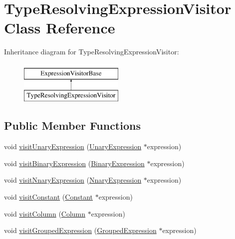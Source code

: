 \hypertarget{class_type_resolving_expression_visitor}{\section{Type\+Resolving\+Expression\+Visitor Class Reference}
\label{class_type_resolving_expression_visitor}
}
Inheritance diagram for Type\+Resolving\+Expression\+Visitor\+:\begin{figure}[H]
\begin{center}
\leavevmode
\includegraphics[height=2.000000cm]{class_type_resolving_expression_visitor}
\end{center}
\end{figure}
\subsection*{Public Member Functions}
\begin{DoxyCompactItemize}
\item 
void \hyperlink{class_type_resolving_expression_visitor_a9ae5e5542bbcdfbf81c7c6efb5b3e4fe}{visit\+Unary\+Expression} (\hyperlink{class_unary_expression}{Unary\+Expression} $\ast$expression)
\item 
void \hyperlink{class_type_resolving_expression_visitor_a6f4aca2ea71660065b44815b2a7e6bd8}{visit\+Binary\+Expression} (\hyperlink{class_binary_expression}{Binary\+Expression} $\ast$expression)
\item 
void \hyperlink{class_type_resolving_expression_visitor_a75c505a51dc15d3d4a7c2e5c539f04e7}{visit\+Nnary\+Expression} (\hyperlink{class_nnary_expression}{Nnary\+Expression} $\ast$expression)
\item 
void \hyperlink{class_type_resolving_expression_visitor_a7c5f29e6a4331aafc5bba63e3af64ecd}{visit\+Constant} (\hyperlink{class_constant}{Constant} $\ast$expression)
\item 
void \hyperlink{class_type_resolving_expression_visitor_a1ea3d7f6a0ebd1296df38d71420596bd}{visit\+Column} (\hyperlink{class_column}{Column} $\ast$expression)
\item 
void \hyperlink{class_type_resolving_expression_visitor_a51d54742c7529b2e14b1e3b1ded6c806}{visit\+Grouped\+Expression} (\hyperlink{class_grouped_expression}{Grouped\+Expression} $\ast$expression)
\end{DoxyCompactItemize}
